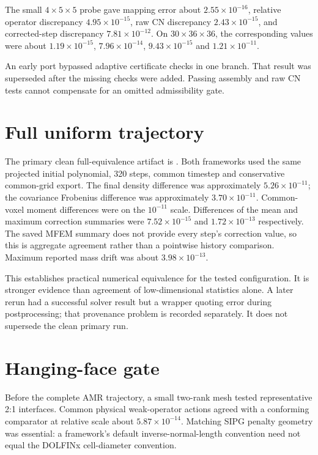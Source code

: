 The small $4\times5\times5$ probe gave mapping error about $2.55\times10^{-16}$, relative operator discrepancy $4.95\times10^{-15}$, raw CN discrepancy $2.43\times10^{-15}$, and corrected-step discrepancy $7.81\times10^{-12}$. On $30\times36\times36$, the corresponding values were about $1.19\times10^{-15}$, $7.96\times10^{-14}$, $9.43\times10^{-15}$ and $1.21\times10^{-11}$.

An early port bypassed adaptive certificate checks in one branch. That result was superseded after the missing checks were added. Passing assembly and raw CN tests cannot compensate for an omitted admissibility gate.

\section{Full uniform trajectory}
The primary clean full-equivalence artifact is
.
Both frameworks used the same projected initial polynomial, 320 steps, common timestep and conservative common-grid export. The final density difference was approximately $5.26\times10^{-11}$; the covariance Frobenius difference was approximately $3.70\times10^{-11}$. Common-voxel moment differences were on the $10^{-11}$ scale. Differences of the mean and maximum correction summaries were $7.52\times10^{-15}$ and $1.72\times10^{-13}$ respectively. The saved MFEM summary does not provide every step's correction value, so this is aggregate agreement rather than a pointwise history comparison. Maximum reported mass drift was about $3.98\times10^{-13}$.

This establishes practical numerical equivalence for the tested configuration. It is stronger evidence than agreement of low-dimensional statistics alone. A later rerun had a successful solver result but a wrapper quoting error during postprocessing; that provenance problem is recorded separately. It does not supersede the clean primary run.

\section{Hanging-face gate}
Before the complete AMR trajectory, a small two-rank mesh tested representative 2:1 interfaces. Common physical weak-operator actions agreed with a conforming comparator at relative scale about $5.87\times10^{-14}$. Matching SIPG penalty geometry was essential: a framework's default inverse-normal-length convention need not equal the DOLFINx cell-diameter convention.

